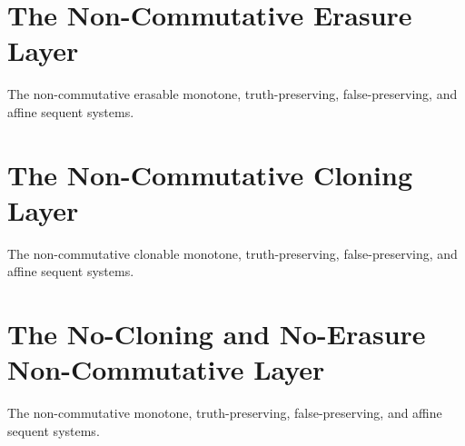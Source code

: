 \documentclass{article}
\begin{document}
\part{The Non-Commutative Erasure Layer}
\begin{center}
	The non-commutative erasable monotone, truth-preserving, false-preserving, and affine sequent systems.
\end{center}

\part{The Non-Commutative Cloning Layer}
\begin{center}
	The non-commutative clonable monotone, truth-preserving, false-preserving, and affine sequent systems.
\end{center}

\part{The No-Cloning and No-Erasure Non-Commutative Layer}
\begin{center}
	The non-commutative monotone, truth-preserving, false-preserving, and affine sequent systems.
\end{center}
\end{document}
